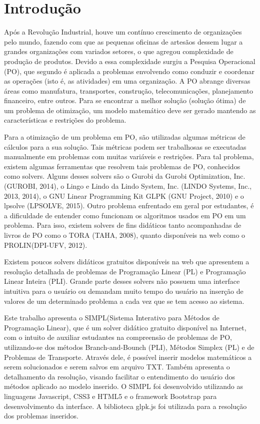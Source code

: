 \documentclass [11pt]{articleSBPO}
\begin{document}
\newpage %

\section{Introdução}\label{sec:introducao}

Após a Revolução Industrial, houve um contínuo crescimento de organizações pelo mundo, fazendo com que as pequenas oficinas de artesãos dessem lugar a grandes organizações com variados setores, o que agregou complexidade de produção de produtos. Devido a essa complexidade surgiu a Pesquisa Operacional (PO), que segundo \cite{hillier; lieberman, 2013} é aplicada a problemas envolvendo como conduzir e coordenar as operações (isto é, as atividades) em uma organização. A PO abrange diversas áreas como manufatura, transportes, construção, telecomunicações, planejamento financeiro, entre outros. Para se encontrar a melhor solução (solução ótima) de um problema de otimização, um modelo matemático deve ser gerado mantendo as características e restrições do problema.

Para a otimização de um problema em PO, são utilizadas algumas métricas de cálculos para a sua solução. Tais métricas podem ser trabalhosas se executadas manualmente em problemas com muitas variáveis e restrições. Para tal problema, existem algumas ferramentas que resolvem tais problemas de PO, conhecidos como solvers. Alguns desses solvers são o Gurobi da Gurobi Optimization, Inc. (GUROBI, 2014), o Lingo e Lindo da Lindo System, Inc. (LINDO Systems, Inc., 2013, 2014), o GNU Linear Programming Kit GLPK (GNU Project, 2010) e o lpsolve (LPSOLVE, 2015). Outro problema enfrentado em geral por estudantes, é a dificuldade de entender como funcionam os algoritmos usados em PO em um problema. Para isso, existem solvers de fins didáticos tanto acompanhadas de livros de PO como o TORA (TAHA, 2008), quanto disponíveis na web como o PROLIN(DPI-UFV, 2012). 

Existem poucos solvers didáticos gratuitos disponíveis na web que apresentem a resolução detalhada de problemas de Programação Linear (PL) e Programação Linear Inteira (PLI). Grande parte desses solvers não possuem uma interface intuitiva para o usuário ou demandam muito tempo do usuário na inserção de valores de um determinado problema a cada vez que se tem acesso ao sistema.

Este trabalho apresenta o SIMPL(Sistema Interativo para Métodos de Programação Linear), que é um solver didático gratuito disponível na Internet, com o intuito de auxiliar estudantes na compreensão de problemas de PO, utilizando-se dos métodos Branch-and-Bounch (PLI), Métodos Simplex (PL) e de Problemas de Transporte. Através dele, é possível inserir modelos matemáticos a serem solucionados e serem salvos em arquivo TXT. Também apresenta o detalhamento da resolução, visando facilitar o entendimento do usuário dos métodos aplicado ao modelo inserido. O SIMPL foi desenvolvido utilizando as linguagens Javascript, CSS3 e HTML5 e o framework Bootstrap para desenvolvimento da interface. A biblioteca glpk.js foi utilizada para a resolução dos problemas inseridos.
\end{document}
